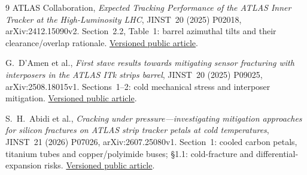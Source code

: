 \begingroup
\renewcommand{\bibname}{Strip detector references}
\renewcommand{\chapter}[2][]{\subsection*{Strip detector references}}
\small\raggedright
\begin{thebibliography}{9}
 ATLAS Collaboration,
\emph{Expected Tracking Performance of the ATLAS Inner Tracker at the
High-Luminosity LHC}, JINST~20 (2025) P02018, arXiv:2412.15090v2.
Section~2.2, Table~1: barrel azimuthal tilts and their clearance/overlap rationale.
\href{https://arxiv.org/html/2412.15090v2}{Versioned public article}.

 G.~D'Amen et al.,
\emph{First stave results towards mitigating sensor fracturing with interposers
in the ATLAS ITk strips barrel}, JINST~20 (2025) P09025,
arXiv:2508.18015v1. Sections~1--2: cold mechanical stress and interposer mitigation.
\href{https://arxiv.org/html/2508.18015v1}{Versioned public article}.

 S.~H.~Abidi et al.,
\emph{Cracking under pressure---investigating mitigation approaches for silicon
fractures on ATLAS strip tracker petals at cold temperatures},
JINST~21 (2026) P07026, arXiv:2607.25080v1.
Section~1: cooled carbon petals, titanium tubes and copper/polyimide buses;
\S1.1: cold-fracture and differential-expansion risks.
\href{https://arxiv.org/html/2607.25080v1}{Versioned public article}.
\end{thebibliography}
\endgroup
